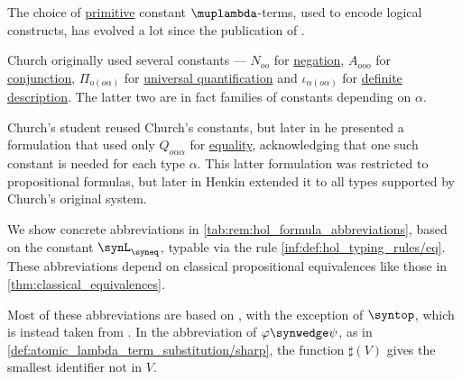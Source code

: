 \begin{remark}\label{rem:hol_formula_abbreviations}
  The choice of \hyperref[con:primitive_notion]{primitive} constant \( \muplambda \)-terms, used to encode logical constructs, has evolved a lot since the publication of \cite{Church1940STT}.

  Church originally used several constants --- \( N_{oo} \) for \hyperref[def:propositional_alphabet/negation]{negation}, \( A_{ooo} \) for \hyperref[def:propositional_alphabet/connectives/conjunction]{conjunction}, \( \Pi_{o(o\alpha)} \) for \hyperref[def:predicate_logic_alphabet/quantifiers/universal]{universal quantification} and \( \iota_{\alpha(o\alpha)} \) for \hyperref[con:description_operator/iota]{definite description}. The latter two are in fact families of constants depending on \( \alpha \).

  Church's student \textcite{Henkin1950CompletenessInTheoryOfTypes} reused Church's constants, but later in \Textcite{Henkin1963TheoryOfPropositionalTypes} he presented a formulation that used only \( Q_{o \alpha \alpha } \) for \hyperref[def:predicate_logic_alphabet/equality]{equality}, acknowledging that one such constant is needed for each type \( \alpha \). This latter formulation was restricted to propositional formulas, but later in \cite{Henkin1975Identity} Henkin extended it to all types supported by Church's original system.

  We show concrete abbreviations in \cref{tab:rem:hol_formula_abbreviations}, based on the constant \( \synL_{\syneq} \), typable via the rule \ref{inf:def:hol_typing_rules/eq}. These abbreviations depend on classical propositional equivalences like those in \cref{thm:classical_equivalences}.

  Most of these abbreviations are based on \cite[212]{Andrews2002Logic}, with the exception of \( \syntop \), which is instead taken from \cite[273]{Farmer2008STTVirtues}. In the abbreviation of \( \varphi \synwedge \psi \), as in \cref{def:atomic_lambda_term_substitution/sharp}, the function \( \sharp(V) \) gives the smallest identifier not in \( V \).


\end{remark}
